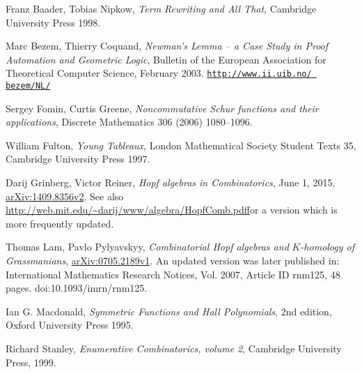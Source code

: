 \documentclass[numbers=enddot,12pt,final,onecolumn,notitlepage]{scrartcl}%
\theoremstyle{definition}
\begin{document}
\begin{thebibliography}{99999999}                                                                                         %


Franz Baader, Tobias Nipkow, \textit{Term
Rewriting and All That}, Cambridge University Press 1998.

Marc Bezem, Thierry Coquand, \textit{Newman's Lemma
-- a Case Study in Proof Automation and Geometric Logic}, Bulletin of the
European Association for Theoretical Computer Science, February 2003.\newline%
\texttt{\href{http://www.ii.uib.no/~bezem/NL/}{http://www.ii.uib.no/%
bezem/NL/}}

Sergey Fomin, Curtis Greene, \textit{Noncommutative
Schur functions and their applications}, Discrete Mathematics 306 (2006) 1080--1096.

William Fulton, \textit{Young Tableaux}, London
Mathematical Society Student Texts 35, Cambridge University Press 1997.

Darij Grinberg, Victor Reiner, \textit{Hopf
algebras in Combinatorics}, June 1, 2015,
\href{http://arxiv.org/abs/1409.8356v2}{arXiv:1409.8356v2}. \newline See also
\url{http://web.mit.edu/~darij/www/algebra/HopfComb.pdf}{f}or a version which
is more frequently updated.

Thomas Lam, Pavlo Pylyavskyy, \textit{Combinatorial
Hopf algebras and }$K$\textit{-homology of Grassmanians},
\href{http://arxiv.org/abs/0705.2189v1}{arXiv:0705.2189v1}. An updated version
was later published in: International Mathematics Research Notices, Vol. 2007,
Article ID rnm125, 48 pages. doi:10.1093/imrn/rnm125.

Ian G. Macdonald, \textit{Symmetric Functions and
Hall Polynomials}, 2nd edition, Oxford University Press 1995.

Richard Stanley, \textit{Enumerative Combinatorics,
volume 2}, Cambridge University Press, 1999.
\end{thebibliography}
\end{document}

